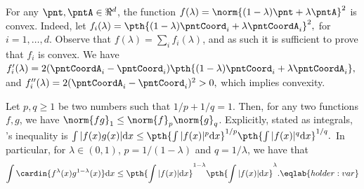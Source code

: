 \begin{tedium}
    For any $\pnt, \pntA \in \Re^d$, the function
    $f(\lambda) =\norm{ (1-\lambda)\pnt + \lambda \pntA}^2$ is
    convex. Indeed, let
    \begin{math}
        f_i(\lambda) = \pth{ (1-\lambda)\pntCoord_i + \lambda
           \pntCoordA_i}^2,
    \end{math}
    for $i=1,\ldots, d$. Observe that
    $f(\lambda) = \sum_i f_i(\lambda)$, and as such it is sufficient
    to prove that $f_i$ is convex. We have
    \begin{math}
        f_i'(\lambda) = 2(\pntCoordA_i - \pntCoord_i)\pth{\bigl.
           (1-\lambda)\pntCoord_i + \lambda \pntCoordA_i},
    \end{math}
    and
    \begin{math}
        f_i''(\lambda) = 2(\pntCoordA_i - \pntCoord_i)^2 > 0,
    \end{math}
    which implies convexity.
\end{tedium}

\begin{fact}
    Let $p,q \geq 1$ be two numbers such that $1/p+1/q=1$. Then, for
    any two functions $f,g$, we have
    $\norm{fg}_1 \leq \norm{f}_p \norm{g}_q$. Explicitly, stated as
    integrals, \Holder's inequality is
    \begin{math}
        \int |f(x) g(x)| \mathrm{d} x \leq \pth{\int |f(x)|^p
           \mathrm{d} x}^{1/p} \pth{\int |f(x)|^q \mathrm{d} x}^{1/q}.
    \end{math}
    In particular, 
    for $\lambda \in (0,1)$, $p=1/(1-\lambda)$ and $q=1/\lambda$, we
    have that
    \begin{equation}
        \int \cardin{f^\lambda (x) g^{1-\lambda}(x)} \mathrm{d} x%
        \leq%
        \pth{\int |f(x)|
           \mathrm{d} x}^{1-\lambda} \pth{\int |f(x)| \mathrm{d}
           x}^{\lambda}.
        \eqlab{holder:var}
    \end{equation}
\end{fact}

